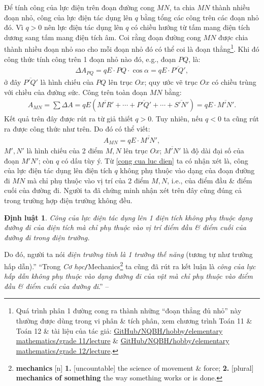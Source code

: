 \documentclass[oneside]{book}
\numberwithin{equation}{section}
\newtheorem{dinhluat}{Định luật}[section]
\begin{document}
Để tính công của lực điện trên đoạn đường cong $MN$, ta chia $MN$ thành nhiều đoạn nhỏ, công của lực điện tác dụng lên $q$ bằng tổng các công trên các đoạn nhỏ đó. Vì $q > 0$ nên lực điện tác dụng lên $q$ có chiều hướng từ tấm mang điện tích dương sang tấm mang điện tích âm. Coi rằng đoạn đường cong $MN$ được chia thành nhiều đoạn nhỏ sao cho mỗi đoạn nhỏ đó có thể coi là đoạn thẳng\footnote{Quá trình phân 1 đường cong ra thành những ``đoạn thẳng đủ nhỏ'' này thường được dùng trong vi phân \& tích phân, xem chương trình Toán 11 \& Toán 12 \& tài liệu của tác giả: \href{https://github.com/NQBH/hobby/blob/master/elementary_mathematics/grade_11/NQBH_elementary_mathematics_grade_11.pdf}{GitHub\texttt{/}NQBH\texttt{/}hobby\texttt{/}elementary mathematics\texttt{/}grade 11\texttt{/}lecture} \& \href{https://github.com/NQBH/hobby/blob/master/elementary_mathematics/grade_12/NQBH_elementary_mathematics_grade_12.pdf}{GitHub\texttt{/}NQBH\texttt{/}hobby\texttt{/}elementary mathematics\texttt{/}grade 12\texttt{/}lecture}.}. Khi đó công thức tính công trên 1 đoạn nhỏ nào đó, e.g., đoạn $PQ$, là:
\begin{align*}
	\Delta A_{PQ} = qE\cdot PQ\cdot\cos\alpha = qE\cdot\overline{P'Q'},
\end{align*}
ở đây $\overline{P'Q'}$ là hình chiếu của $PQ$ lên trục $Ox$; quy ước vẽ trục $Ox$ có chiều trùng với chiều của đường sức. Công trên toàn đoạn $MN$ bằng:
\begin{align}
	A_{MN} = \sum \Delta A = qE\left(\overline{M'R'} + \cdots + \overline{P'Q'} + \cdots + \overline{S'N'}\right) = qE\cdot\overline{M'N'}.
\end{align}
Kết quả trên đây được rút ra từ giả thiết $q > 0$. Tuy nhiên, nếu $q < 0$ ta cũng rút ra được công thức như trên. Do đó có thể viết:
\begin{align}
	\label{cong cua luc dien}
	A_{MN} = qE\cdot\overline{M'N'},
\end{align}
$M',N'$ là hình chiếu của 2 điểm $M,N$ lên trục $Ox$; $\overline{M'N'}$ là độ dài đại số của đoạn $M'N'$; còn $q$ có dấu tùy ý. Từ  \eqref{cong cua luc dien} ta có nhận xét là, công của lực điện tác dụng lên điện tích $q$ không phụ thuộc vào dạng của đoạn đường đi $MN$ mà chỉ phụ thuộc vào vị trí của 2 điểm $M,N$, i.e., của điểm đầu \& điểm cuối của đường đi. Người ta đã chứng minh nhận xét trên đây cũng đúng cả trong trường hợp điện trường không đều.

\begin{dinhluat}
	Công của lực điện tác dụng lên 1 điện tích không phụ thuộc dạng đường đi của điện tích mà chỉ phụ thuộc vào vị trí điểm đầu \& điểm cuối của đường đi trong điện trường.
\end{dinhluat}
Do đó, người ta nói \textit{điện trường tĩnh là 1 trường thế năng} (tương tự như trường hấp dẫn).'' ``Trong \textit{Cơ học}\texttt{/}Mechanics\footnote{\textbf{mechanics} [n] \textbf{1.} [uncountable] the science of movement \& force; \textbf{2.} [plural] \textbf{mechanics of something} the way something works or is done.} ta cũng đã rút ra kết luận là \textit{công của lực hấp dẫn không phụ thuộc vào dạng đường đi của vật mà chỉ phụ thuộc vào điểm đầu \& điểm cuối của đường đi}.'' -- \cite[pp. 19--20]{SGK_Vat_Ly_11_nang_cao}
\end{document}
